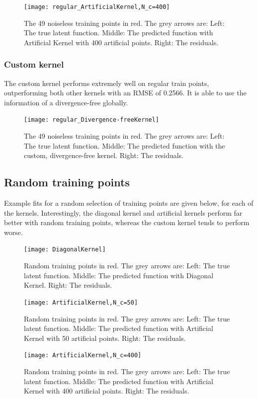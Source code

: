 \documentclass[12pt,a4paper,twoside]{report}
\theoremstyle{definition}
\begin{document}
\begin{figure}[ht]
	\centering
	\texttt{[image: regular\_ArtificialKernel,N\_c=400]}
	\caption{The 49 noiseless training points in red. The grey arrows are: Left: The true latent function. Middle: The predicted function with Artificial Kernel with 400 artificial points. Right: The residuals.}
	\label{regartif400}
\end{figure}

\subsubsection{Custom kernel}
The custom kernel performs extremely well on regular train points, outperforming both other kernels with an RMSE of 0.2566. It is able to use the information of a divergence-free globally.

\begin{figure}[ht]
	\centering
	\texttt{[image: regular\_Divergence-freeKernel]}
	\caption{The 49 noiseless training points in red. The grey arrows are: Left: The true latent function. Middle: The predicted function with the custom, divergence-free kernel. Right: The residuals.}
\end{figure}

\clearpage
\subsection{Random training points}
Example fits for a random selection of training points are given below, for each of the kernels. Interestingly, the diagonal kernel and artificial kernels perform far better with random training points, whereas the custom kernel tends to perform worse.

\begin{figure}[ht]
	\centering
	\texttt{[image: DiagonalKernel]}
	\caption{Random training points in red. The grey arrows are: Left: The true latent function. Middle: The predicted function with Diagonal Kernel. Right: The residuals.}
	\label{diag}
\end{figure}


\begin{figure}[ht]
	\centering
	\texttt{[image: ArtificialKernel,N\_c=50]}
	\caption{Random training points in red. The grey arrows are: Left: The true latent function. Middle: The predicted function with Artificial Kernel with 50 artificial points. Right: The residuals.}
	\label{artif50}
\end{figure}

\begin{figure}[ht]
	\centering
	\texttt{[image: ArtificialKernel,N\_c=400]}
	\caption{Random training points in red. The grey arrows are: Left: The true latent function. Middle: The predicted function with Artificial Kernel with 400 artificial points. Right: The residuals.}
	\label{artif400}
\end{figure}
\end{document}

